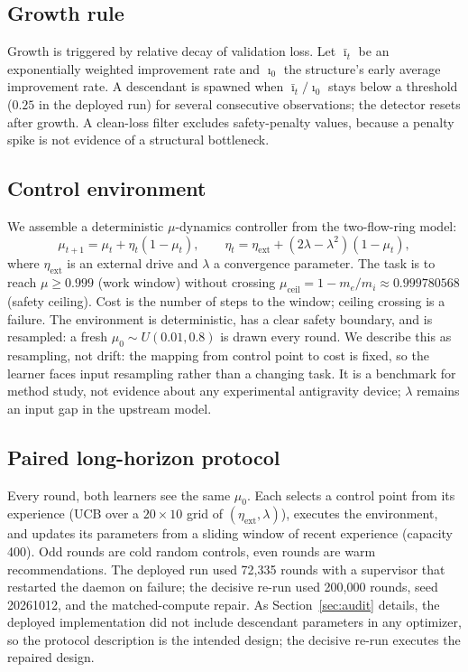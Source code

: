 \documentclass[11pt]{article}
\begin{document}
\subsection{Growth rule}

Growth is triggered by relative decay of validation loss. Let $\bar\imath_t$ be an exponentially weighted improvement rate and $\imath_0$ the structure's early average improvement rate. A descendant is spawned when $\bar\imath_t/\imath_0$ stays below a threshold ($0.25$ in the deployed run) for several consecutive observations; the detector resets after growth. A clean-loss filter excludes safety-penalty values, because a penalty spike is not evidence of a structural bottleneck.

\subsection{Control environment}

We assemble a deterministic $\mu$-dynamics controller from the two-flow-ring model:
\begin{equation}
 \mu_{t+1}=\mu_t+\eta_t(1-\mu_t),
 \qquad
 \eta_t=\eta_{\mathrm{ext}}+(2\lambda-\lambda^2)(1-\mu_t),
\end{equation}
where $\eta_{\mathrm{ext}}$ is an external drive and $\lambda$ a convergence parameter. The task is to reach $\mu\ge 0.999$ (work window) without crossing $\mu_{\mathrm{ceil}}=1-m_e/m_i\approx0.999780568$ (safety ceiling). Cost is the number of steps to the window; ceiling crossing is a failure. The environment is deterministic, has a clear safety boundary, and is resampled: a fresh $\mu_0\sim U(0.01,0.8)$ is drawn every round. We describe this as resampling, not drift: the mapping from control point to cost is fixed, so the learner faces input resampling rather than a changing task. It is a benchmark for method study, not evidence about any experimental antigravity device; $\lambda$ remains an input gap in the upstream model.

\subsection{Paired long-horizon protocol}

Every round, both learners see the same $\mu_0$. Each selects a control point from its experience (UCB over a $20\times10$ grid of $(\eta_{\mathrm{ext}},\lambda)$), executes the environment, and updates its parameters from a sliding window of recent experience (capacity 400). Odd rounds are cold random controls, even rounds are warm recommendations. The deployed run used 72,335 rounds with a supervisor that restarted the daemon on failure; the decisive re-run used 200,000 rounds, seed 20261012, and the matched-compute repair. As Section~\ref{sec:audit} details, the deployed implementation did not include descendant parameters in any optimizer, so the protocol description is the intended design; the decisive re-run executes the repaired design.
\end{document}
